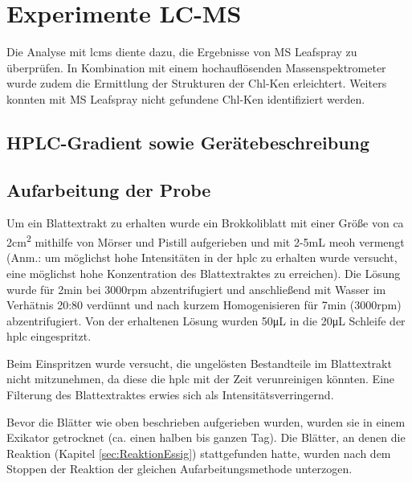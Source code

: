 \chapter{Experimente LC-MS} 

Die Analyse mit \gls{lcms} diente dazu, die Ergebnisse von MS Leafspray zu überprüfen. In Kombination mit einem hochauflösenden Massenspektrometer wurde zudem die Ermittlung der Strukturen der \gls{Chl-K}en erleichtert. Weiters konnten mit MS Leafspray nicht gefundene \gls{Chl-K}en identifiziert werden. \\

\section{HPLC-Gradient sowie Gerätebeschreibung} \label{sec:HPLCAufarbeitungderProbe} 

\section{Aufarbeitung der Probe} \label{sec:HPLCAufarbeitungderProbe}

Um ein Blattextrakt zu erhalten wurde ein Brokkoliblatt mit einer Größe von \gls{ca} 2\si{cm^{2}} mithilfe von Mörser und Pistill aufgerieben und mit 2-5mL \gls{meoh} vermengt (Anm.: um möglichst hohe Intensitäten in der \gls{hplc} zu erhalten wurde versucht, eine möglichst hohe Konzentration des Blattextraktes zu erreichen). Die Lösung wurde für 2min bei 3000rpm abzentrifugiert und anschließend mit Wasser im Verhätnis 20:80 verdünnt und nach kurzem Homogenisieren für 7min (3000rpm) abzentrifugiert. Von der erhaltenen Lösung wurden 50\si{\uL} in die 20\si{\uL} Schleife der \gls{hplc} eingespritzt. 


Beim Einspritzen wurde versucht, die ungelösten Bestandteile im Blattextrakt nicht mitzunehmen, da diese die \gls{hplc} mit der Zeit verunreinigen könnten. Eine Filterung des Blattextraktes erwies sich als Intensitätsverringernd.

Bevor die Blätter wie oben beschrieben aufgerieben wurden, wurden sie in einem Exikator getrocknet (ca. einen halben bis ganzen Tag). Die Blätter, an denen die Reaktion (Kapitel \ref{sec:ReaktionEssig}) stattgefunden hatte, wurden nach dem Stoppen der Reaktion der gleichen Aufarbeitungsmethode unterzogen. 

